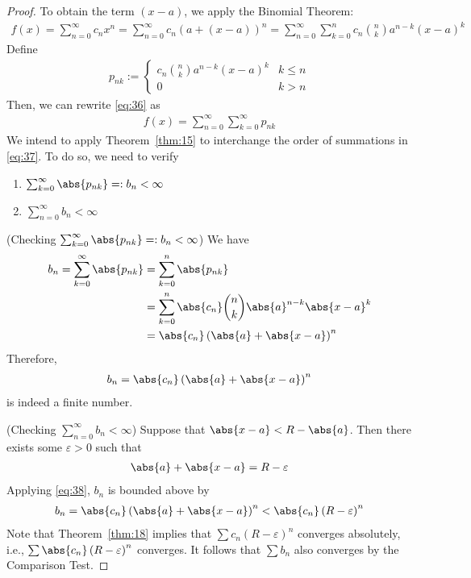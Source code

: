 \documentclass[thmcnt=section, 12pt]{elegantbook}
\begin{document}
\begin{proof}
    To obtain the term $(x-a)$, we apply the Binomial Theorem:
    \begin{align}
        f(x) = \sum_{n=0}^\infty c_n x^n
        = \sum_{n=0}^\infty c_n \left(a + (x-a)\right)^n
        = \sum_{n=0}^\infty \sum_{k=0}^n c_n \binom{n}{k} a^{n-k} (x-a)^k
        \label{eq:36}
    \end{align}
    Define 
    \begin{align*}
        p_{nk} := \begin{cases}
            c_n \binom{n}{k} a^{n-k} (x-a)^k &k \leq n \\ 
            0 &k > n
        \end{cases}
    \end{align*}
    Then, we can rewrite \eqref{eq:36} as 
    \begin{align}
        f(x) = \sum_{n=0}^\infty \sum_{k=0}^\infty p_{nk}
        \label{eq:37}
    \end{align}
    We intend to apply Theorem~\ref{thm:15} to interchange the order of summations in \eqref{eq:37}. To do so, we need to verify 
    \begin{enumerate}
        \item $\sum_{k=0}^\infty \abs{p_{nk}} =: b_n < \infty$
        \item $\sum_{n=0}^\infty b_n < \infty$
    \end{enumerate}

    \par (Checking $\sum_{k=0}^\infty \abs{p_{nk}} =: b_n < \infty$) We have 
    \begin{align*}
        b_n = \sum_{k=0}^\infty \abs{p_{nk}}
        &= \sum_{k=0}^n \abs{p_{nk}} \\ 
        &= \sum_{k=0}^n \abs{c_n} \binom{n}{k} \abs{a}^{n-k} \abs{x-a}^k \\ 
        &= \abs{c_n} \left(\abs{a} + \abs{x-a}\right)^n
    \end{align*}
    Therefore, 
    \begin{align}
        b_n = \abs{c_n} \left(\abs{a} + \abs{x-a}\right)^n
        \label{eq:38}
    \end{align}
    is indeed a finite number.

    \par (Checking $\sum_{n=0}^\infty b_n < \infty$) Suppose that $\abs{x-a} < R - \abs{a}$. Then there exists some $\varepsilon > 0$ such that 
    \begin{align*}
        \abs{a} + \abs{x-a} = R - \varepsilon
    \end{align*}
    Applying \eqref{eq:38}, $b_n$ is bounded above by 
    \begin{align*}
        b_n = \abs{c_n} \left(\abs{a} + \abs{x-a}\right)^n
        < \abs{c_n} \left(R - \varepsilon\right)^n
    \end{align*}
    Note that Theorem~\ref{thm:18} implies that $\sum c_n (R-\varepsilon)^n$ converges absolutely, i.e., $\sum \abs{c_n} \left(R - \varepsilon\right)^n$ converges. It follows that $\sum b_n$ also converges by the Comparison Test. 


\end{proof}
\end{document}
